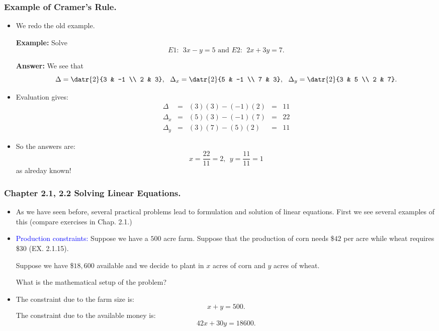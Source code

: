 \begin{frame}
  \frametitle{Example of Cramer's Rule.}
  \begin{itemize}%
  
 \item We redo the old example.
 
 {\bf Example:} Solve
$$E1:~~3x-y=5 \mbox{ and } E2:~~ 2x+3y = 7.$$
 
 {\bf Answer:}
We see that 
$$\Delta = \datr{2}{3 & -1 \\ 2 & 3},~~\Delta_x = \datr{2}{5 & -1 \\ 7 & 3},~~
\Delta_y=\datr{2}{3 & 5 \\ 2 & 7}.$$
\item Evaluation gives:
$$
\begin{array}{lllll}
\Delta & = & (3)(3)-(-1)(2)& = & 11\\
 \Delta_x& = & (5)(3)-(-1)(7)& = & 22\\
 \Delta_y& = & (3)(7)-(5)(2) & = &  11
 \end{array}
 $$
\item So the answers are: 
$$x=\frac{22}{11}=2,~~y=\frac{11}{11}=1$$
as alreday known!

 
\end{itemize}

\end{frame}
\begin{frame} %

  \frametitle{Chapter 2.1, 2.2 Solving Linear Equations.} 
  \begin{itemize}%
  \item 
    As we have seen before, several practical problems lead to
    formulation and solution of linear equations.
    First we see several examples of this
    (compare exercises in Chap. 2.1.)
    
    
   
 
  \item 
    \textcolor{blue}{Production constraints:}
    Suppose we have a $500$ acre farm.
    Suppose that the production of corn needs \$$42$ per acre while wheat
    requires \$$30$ (EX. 2.1.15).

    Suppose we have \$$18,600$ available
    and we decide to plant in $x$ acres of corn and $y$ acres of wheat.

    What is the mathematical setup of the problem? 
    
  
  \item 
   The constraint due to the farm size is:
   $$x+y = 500.$$
   The constraint due to the available money is:
   $$42x+30y = 18600.$$
  
   
   
  \end{itemize}
\end{frame}

